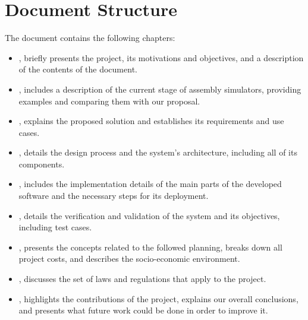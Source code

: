 \section{Document Structure}\label{sec:structure}
The document contains the following chapters:
\begin{itemize}
  \item {}, briefly presents the project, its motivations and objectives, and a description of the contents of the document.
  \item {}, includes a description of the current stage of \gls{assembly} simulators, providing examples and comparing them with our proposal.
  \item {}, explains the proposed solution and establishes its requirements and use cases.
  \item {}, details the design process and the system's architecture, including all of its components.
  \item {}, includes the implementation details of the main parts of the developed software and the necessary steps for its deployment.
  \item {}, details the verification and validation of the system and its objectives, including test cases.
  \item {}, presents the concepts related to the followed planning, breaks down all project costs, and describes the socio-economic environment.
  \item {}, discusses the set of laws and regulations that apply to the project.
  \item {}, highlights the contributions of the project, explains our overall conclusions, and presents what future work could be done in order to improve it.
\end{itemize}